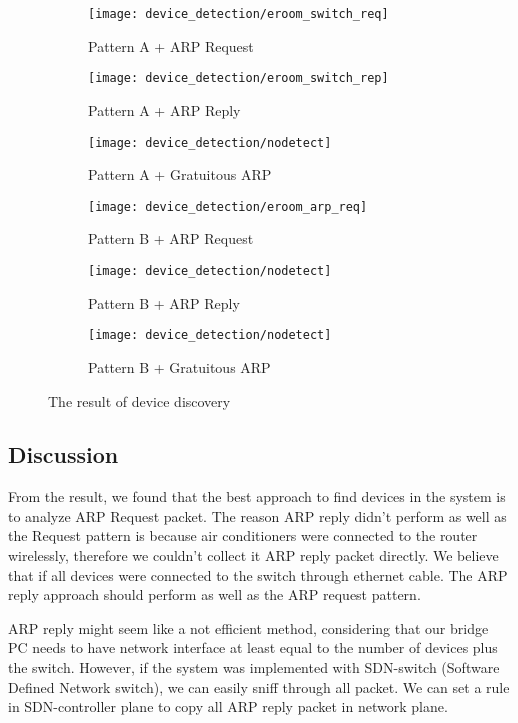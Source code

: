 \begin{figure}[h]
    \centering
    \begin{subfigure}[b]{0.25\textwidth}
        \centering
        \texttt{[image: device\_detection/eroom\_switch\_req]}
        \caption{Pattern A + ARP Request}
        \label{fig:s4_eroom_a_req}
    \end{subfigure}
    \hfill
    \begin{subfigure}[b]{0.25\textwidth}
        \centering
        \texttt{[image: device\_detection/eroom\_switch\_rep]}
        \caption{Pattern A + ARP Reply}
        \label{fig:s4_eroom_a_rep}
    \end{subfigure}
    \hfill
    \begin{subfigure}[b]{0.25\textwidth}
        \centering
        \texttt{[image: device\_detection/nodetect]}
        \caption{Pattern A + Gratuitous ARP}
        \label{fig:s4_errom_a_gra}
    \end{subfigure}
    \newline 
    \begin{subfigure}[b]{0.25\textwidth}
        \centering
        \texttt{[image: device\_detection/eroom\_arp\_req]}
        \caption{Pattern B + ARP Request}
        \label{fig:s4_10f_b_req}
    \end{subfigure}
    \hfill
    \begin{subfigure}[b]{0.25\textwidth}
        \centering
        \texttt{[image: device\_detection/nodetect]}
        \caption{Pattern B + ARP Reply}
        \label{fig:s4_eroom_b_rep}
    \end{subfigure}
    \hfill
    \begin{subfigure}[b]{0.25\textwidth}
        \centering
        \texttt{[image: device\_detection/nodetect]}
        \caption{Pattern B + Gratuitous ARP}
        \label{fig:s4_eroom_b_gra}
    \end{subfigure}

    \caption{The result of device discovery}
    \label{fig:s4_device_discovery_result}
\end{figure}

\subsection{Discussion}
From the result, we found that the best approach to find devices in the system is to analyze ARP Request packet. 
The reason ARP reply didn’t perform as well as the Request pattern is because air conditioners were connected to the router wirelessly,
 therefore we couldn’t collect it ARP reply packet directly. We believe that if all devices were connected to the switch through ethernet cable. The ARP reply approach should perform as well as the ARP request pattern.  
 
ARP reply might seem like a not efficient method, considering that our bridge PC needs to have network interface at least equal to the number of devices plus the switch. However, if the system was implemented with SDN-switch (Software Defined Network switch), we can easily sniff through all packet. We can set a rule in SDN-controller plane to copy all ARP reply packet in network plane. 
